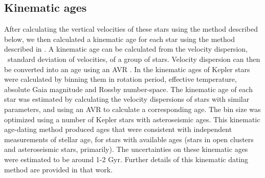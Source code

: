 \subsection{Kinematic ages}
\label{sec:kinematic_ages}

After calculating the vertical velocities of these stars using the method
described below, we then calculated a kinematic age for each star using the
method described in \citet{lu2020}.
A kinematic age can be calculated from the velocity dispersion, \ie\ standard
deviation of velocities, of a group of stars.
Velocity dispersion can then be converted into an age using an AVR
\citep[\eg][]{holmberg2009, yu2018}.
In \citet{lu202lu20200} the kinematic ages of Kepler stars were calculated by
binning them in rotation period, effective temperature, absolute Gaia
magnitude and Rossby number-space.
The kinematic age of each star was estimated by calculating the velocity
dispersions of stars with similar parameters, and using an AVR to calculate a
corresponding age.
The bin size was optimized using a number of Kepler stars with asteroseismic
ages.
This kinematic age-dating method produced ages that were consistent with
independent measurements of stellar age, for stars with available ages (stars
in open clusters and asteroseismic stars, primarily).
The uncertainties on these kinematic ages were estimated to be around 1-2 Gyr.
Further details of this kinematic dating method are provided in that work.



